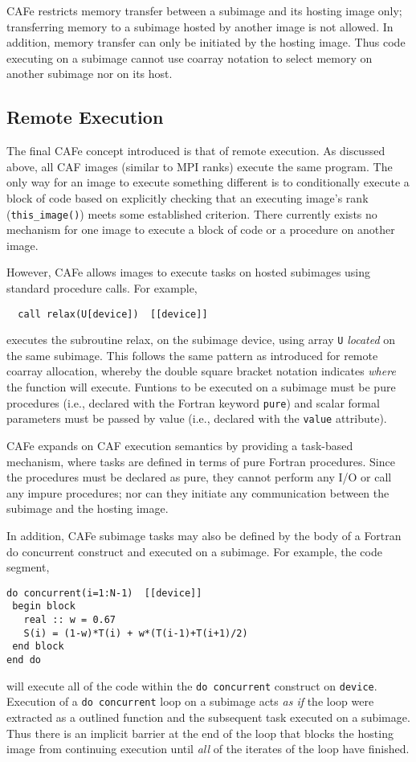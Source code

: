 CAFe restricts memory transfer between a subimage and its hosting image only; transferring
memory to a subimage hosted by another image is not allowed.  In addition, memory transfer
can only be initiated by the hosting image.  Thus code executing on a subimage cannot use
coarray notation to select memory on another subimage nor on its host.

\subsection{Remote Execution}

The final CAFe concept introduced is that of remote execution.  As discussed above,
all CAF images (similar to MPI ranks) execute the same program.  The only way for
an image to execute something different is to conditionally execute a block of code based
on explicitly checking that an executing image's rank (\texttt{this\_image()}) meets some
established criterion.  There currently exists no mechanism for one image to execute a
block of code or a procedure on another image.

However, CAFe allows images to execute tasks on hosted subimages using standard procedure
calls.  For example,
\small
\begin{verbatim}
  call relax(U[device])  [[device]]
\end{verbatim}
\normalsize
executes the subroutine relax, on the subimage device, using array \texttt{U} \emph{located}
on the same subimage.  This follows the same pattern as introduced for remote coarray allocation,
whereby the double square bracket notation indicates \emph{where} the function will execute.
Funtions to be executed on a subimage must be pure procedures (i.e., declared with the Fortran
keyword \texttt{pure}) and scalar formal parameters must be passed by value (i.e., declared with the
\texttt{value} attribute).

CAFe expands on CAF execution semantics by providing a task-based mechanism, where tasks
are defined in terms of pure Fortran procedures.  Since the procedures must be declared
as pure, they cannot perform any I/O or call any impure procedures; nor can they initiate
any communication between the subimage and the hosting image.

In addition, CAFe subimage tasks may also be defined by the body of a Fortran do
concurrent construct and executed on a subimage.  For example, the code segment,
\small
\begin{verbatim}
do concurrent(i=1:N-1)  [[device]]
 begin block
   real :: w = 0.67
   S(i) = (1-w)*T(i) + w*(T(i-1)+T(i+1)/2)
 end block
end do
\end{verbatim}
\normalsize
will execute all of the code within the \texttt{do concurrent} construct on \texttt{device}.
Execution of a \texttt{do concurrent} loop on a subimage acts \emph{as if} the loop were
extracted as a outlined function and the subsequent task executed on a subimage.  Thus
there is an implicit barrier at the end of the loop that blocks the hosting image
from continuing execution until \emph{all} of the iterates of the loop have finished.

